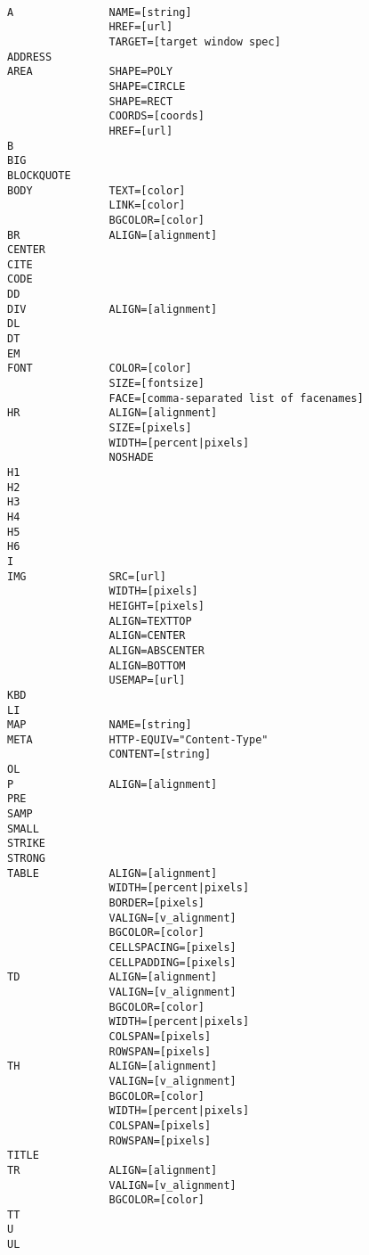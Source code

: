 \begin{verbatim}

A               NAME=[string]
                HREF=[url]
                TARGET=[target window spec]
ADDRESS
AREA            SHAPE=POLY
                SHAPE=CIRCLE
                SHAPE=RECT
                COORDS=[coords]
                HREF=[url]
B
BIG
BLOCKQUOTE
BODY            TEXT=[color]
                LINK=[color]
                BGCOLOR=[color]
BR              ALIGN=[alignment]
CENTER
CITE
CODE
DD
DIV             ALIGN=[alignment]
DL
DT
EM
FONT            COLOR=[color]
                SIZE=[fontsize]
                FACE=[comma-separated list of facenames]
HR              ALIGN=[alignment]
                SIZE=[pixels]
                WIDTH=[percent|pixels]
                NOSHADE
H1
H2
H3
H4
H5
H6
I
IMG             SRC=[url]
                WIDTH=[pixels]
                HEIGHT=[pixels]
                ALIGN=TEXTTOP
                ALIGN=CENTER
                ALIGN=ABSCENTER
                ALIGN=BOTTOM
                USEMAP=[url]
KBD
LI
MAP             NAME=[string]
META            HTTP-EQUIV="Content-Type"
                CONTENT=[string]
OL
P               ALIGN=[alignment]
PRE
SAMP
SMALL
STRIKE
STRONG
TABLE           ALIGN=[alignment]
                WIDTH=[percent|pixels]
                BORDER=[pixels]
                VALIGN=[v_alignment]
                BGCOLOR=[color]
                CELLSPACING=[pixels]
                CELLPADDING=[pixels]
TD              ALIGN=[alignment]
                VALIGN=[v_alignment]
                BGCOLOR=[color]
                WIDTH=[percent|pixels]
                COLSPAN=[pixels]
                ROWSPAN=[pixels]
TH              ALIGN=[alignment]
                VALIGN=[v_alignment]
                BGCOLOR=[color]
                WIDTH=[percent|pixels]
                COLSPAN=[pixels]
                ROWSPAN=[pixels]
TITLE
TR              ALIGN=[alignment]
                VALIGN=[v_alignment]
                BGCOLOR=[color]
TT
U
UL

\end{verbatim}


